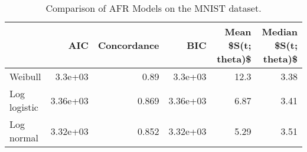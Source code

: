 \begin{table}
\centering
\caption{Comparison of AFR Models on the MNIST dataset.}
\label{tab:mnist}
\begin{tabular}{lrrrrr}
\toprule
{} &      AIC &  Concordance &      BIC &  Mean \$S(t; theta)\$ &  Median \$S(t; theta)\$ \\
\midrule
Weibull      &  3.3e+03 &         0.89 &  3.3e+03 &                12.3 &                  3.38 \\
Log logistic & 3.36e+03 &        0.869 & 3.36e+03 &                6.87 &                  3.41 \\
Log normal   & 3.32e+03 &        0.852 & 3.32e+03 &                5.29 &                  3.51 \\
\bottomrule
\end{tabular}
\end{table}
